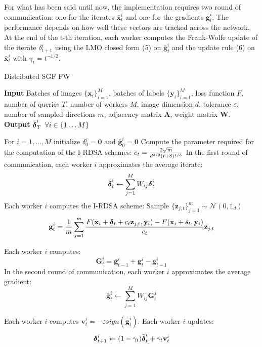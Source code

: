 \indent For what has been said until now, the implementation requires two round of communication: one for the iterates $\bar{\mathbf{x}}_t^i$ and one for the gradients $\bar{\mathbf{g}}_t^i$. The performance depends on how well these vectors are tracked across the network.\\
\indent At the end of the t-th iteration, each worker computes the Frank-Wolfe update of the iterate \mbox{\boldmath$ \delta$}$_{t+1}^i$ using the LMO closed form (5) on $\bar{\mathbf{g}}_t^i$ and the update rule (6) on $\bar{\mathbf{x}}_t^i$ with $\gamma_t = t^{-1/2}$.\\
\begin{algorithm}
	\caption{Distributed SGF FW}\label{distributed}
	\textbf{Input} Batches of images $\{\mathbf{x}_i\}_{i=1}^M$, batches of labels $\{\mathbf{y}_i\}_{i=1}^M$, loss function $F$, number of queries $T$, number of workers $M$, image dimension $d$, tolerance $\varepsilon$, number of sampled directions $m$, adjacency matrix $\mathbf{A}$, weight matrix $\mathbf{W}$.\\
	\textbf{Output} $\bar{\mbox{\boldmath$ \delta$}}_T^i\;\;\forall i \in \{1\dots M\}$
	\begin{algorithmic}[1]		
		\State For $i=1,\dots, M$ initialize \mbox{\boldmath$ \delta$}$_0^i =\mathbf{0} $ and $\bar{\mathbf{g}}_0^i = \mathbf{0}$
		\State Compute the parameter required for the computation of the I-RDSA schemes: 
		${\scriptsize c_t =\frac{2\sqrt{m}}{d^{3/2}(t+8)^{1/3}}}$
		\State In the first round of communication, each worker $i$ approximates the average iterate: \newline
		\[\bar{\mbox{\boldmath$ \delta$}}_t^i \leftarrow \sum_{j=1}^{M} W_{ij}\mbox{\boldmath$ \delta$}_t^i\]
		\State Each worker $i$ computes the I-RDSA scheme:\newline 
		Sample $\{\mathbf{z}_{j,t}\}_{j=1}^m \sim\mathcal{N}(0,\mathbb{1}_d)$ \newline
		\[\mathbf{g}_t^i = \frac{1}{m} \sum_{j=1}^{m} \frac{F(\mathbf{x}_i + \mbox{\boldmath$ \delta$}_t + c_t\mathbf{z}_{j,t}, \mathbf{y}_i) - F(\mathbf{x}_i + \mbox{\scriptsize\boldmath$ \delta$}_t, \mathbf{y}_i)}{c_t}\mathbf{z}_{j,t}\]
		
		\State  Each worker $i$ computes:
		\[ \mathbf{G}_t^i = \bar{\mathbf{g}}_{t-1}^i + \mathbf{g}_t^i - \mathbf{g}_{t-1}^i \]
		\State In the second round of communication, each worker $i$ approximates the average gradient:
		\[ \bar{\mathbf{g}}_t^i \leftarrow \sum_{j=1}^{M} W_{ij}\mathbf{G}_t^j  \]
		
		\State Each worker $i$ computes $\mathbf{v}_t^i = - \varepsilon sign(\bar{\mathbf{g}}^i_t)$.
		\State Each worker $i$ updates:
		\[\mbox{\boldmath$ \delta$}_{t+1}^i \leftarrow (1-\gamma_t)\bar{\mbox{\boldmath$ \delta$}}_t^i + \gamma_t\mathbf{v}_t^i\]
		\EndFor
		
	\end{algorithmic}
\end{algorithm}